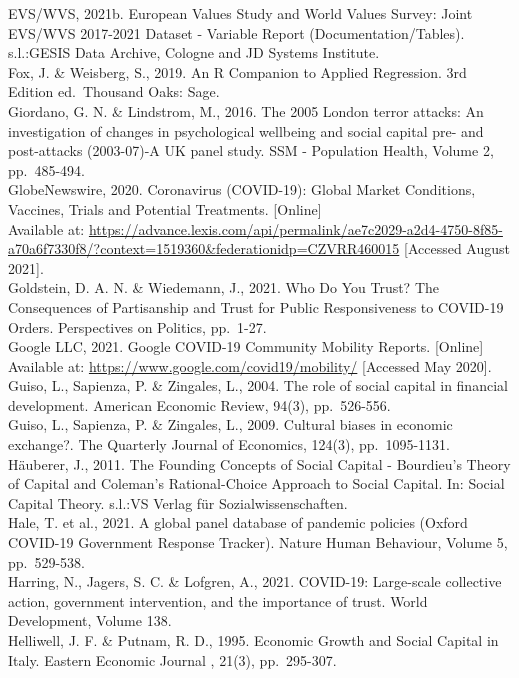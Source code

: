 \documentclass[
  11pt,
]{article}
\begin{document}
EVS/WVS, 2021b. European Values Study and World Values Survey: Joint EVS/WVS 2017-2021 Dataset - Variable Report (Documentation/Tables). s.l.:GESIS Data Archive, Cologne and JD Systems Institute.\\
Fox, J. \& Weisberg, S., 2019. An R Companion to Applied Regression. 3rd Edition ed.~Thousand Oaks: Sage.\\
Giordano, G. N. \& Lindstrom, M., 2016. The 2005 London terror attacks: An investigation of changes in psychological wellbeing and social capital pre- and post-attacks (2003-07)-A UK panel study. SSM - Population Health, Volume 2, pp.~485-494.\\
GlobeNewswire, 2020. Coronavirus (COVID-19): Global Market Conditions, Vaccines, Trials and Potential Treatments. {[}Online{]}\\
Available at: \url{https://advance.lexis.com/api/permalink/ae7c2029-a2d4-4750-8f85-a70a6f7330f8/?context=1519360\&federationidp=CZVRR460015} {[}Accessed August 2021{]}.\\
Goldstein, D. A. N. \& Wiedemann, J., 2021. Who Do You Trust? The Consequences of Partisanship and Trust for Public Responsiveness to COVID-19 Orders. Perspectives on Politics, pp.~1-27.\\
Google LLC, 2021. Google COVID-19 Community Mobility Reports. {[}Online{]}\\
Available at: \url{https://www.google.com/covid19/mobility/} {[}Accessed May 2020{]}.\\
Guiso, L., Sapienza, P. \& Zingales, L., 2004. The role of social capital in financial development. American Economic Review, 94(3), pp.~526-556.\\
Guiso, L., Sapienza, P. \& Zingales, L., 2009. Cultural biases in economic exchange?. The Quarterly Journal of Economics, 124(3), pp.~1095-1131.\\
Häuberer, J., 2011. The Founding Concepts of Social Capital - Bourdieu's Theory of Capital and Coleman's Rational-Choice Approach to Social Capital. In: Social Capital Theory. s.l.:VS Verlag für Sozialwissenschaften.\\
Hale, T. et al., 2021. A global panel database of pandemic policies (Oxford COVID-19 Government Response Tracker). Nature Human Behaviour, Volume 5, pp.~529-538.\\
Harring, N., Jagers, S. C. \& Lofgren, A., 2021. COVID-19: Large-scale collective action, government intervention, and the importance of trust. World Development, Volume 138.\\
Helliwell, J. F. \& Putnam, R. D., 1995. Economic Growth and Social Capital in Italy. Eastern Economic Journal , 21(3), pp.~295-307.\\
\end{document}
